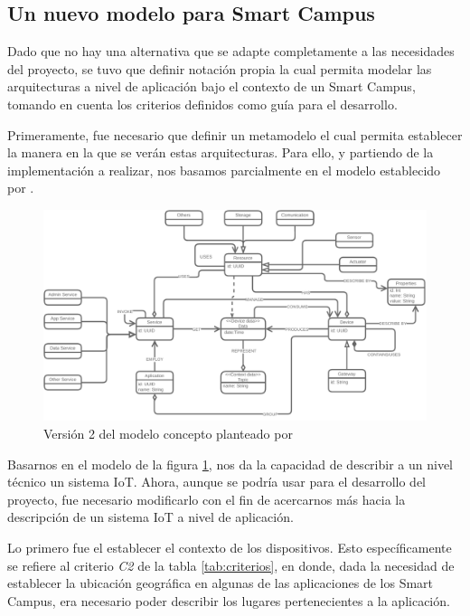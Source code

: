 \subsection{Un nuevo modelo para Smart Campus}

Dado que no hay una alternativa que se adapte completamente a las necesidades del proyecto, se tuvo que definir notación propia la cual permita modelar las arquitecturas a nivel de aplicación bajo el contexto de un Smart Campus, tomando en cuenta los criterios definidos como guía para el desarrollo.

Primeramente, fue necesario que definir un metamodelo el cual permita establecer la manera en la que se verán estas arquitecturas. Para ello, y partiendo de la implementación a realizar, nos basamos parcialmente en el modelo establecido por . 

\begin{figure}[H]
    \centering
    \caption{Versión 2 del modelo concepto planteado por}
    \label{fig:henrymodelo}
    \vspace{2mm}

    \includegraphics[width=\linewidth]{images/HenryModelo.pdf}
\end{figure}

Basarnos en el modelo de la figura \ref{fig:henrymodelo}, nos da la capacidad de describir a un nivel técnico un sistema IoT. Ahora, aunque se podría usar para el desarrollo del proyecto, fue necesario modificarlo con el fin de acercarnos más hacia la descripción de un sistema IoT a nivel de aplicación. 

Lo primero fue el establecer el contexto de los dispositivos. Esto específicamente se refiere al criterio \textit{C2} de la tabla \ref{tab:criterios}, en donde, dada la necesidad de establecer la ubicación geográfica en algunas de las aplicaciones de los Smart Campus, era necesario poder describir los lugares pertenecientes a la aplicación.

